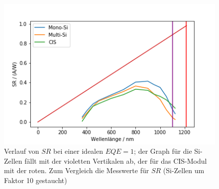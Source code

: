 \begin{figure}[ht]
    \centering
    \includegraphics[scale=0.75]{Bilder/32idealEQE.png}
    \caption{Verlauf von $SR$ bei einer idealen $EQE = 1$; der Graph für die Si-Zellen fällt mit der violetten Vertikalen ab, der für
    das CIS-Modul mit der roten. Zum Vergleich die Messwerte für $SR$ (Si-Zellen um Faktor 10 gestaucht)}
    \label{bild:idealEQEverb}
\end{figure}

